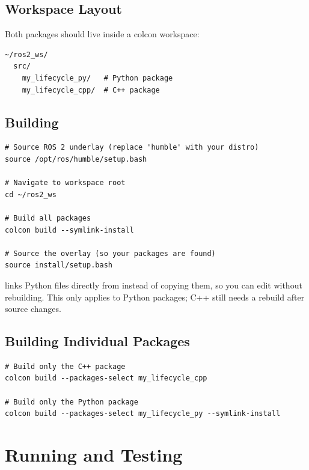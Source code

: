 \documentclass[11pt,a4paper]{csarticle}
\begin{document}
\subsection{Workspace Layout}

Both packages should live inside a colcon workspace:

\begin{lstlisting}[style=bash,caption={Workspace layout}]
~/ros2_ws/
  src/
    my_lifecycle_py/   # Python package
    my_lifecycle_cpp/  # C++ package
\end{lstlisting}

\subsection{Building}

\begin{lstlisting}[style=bash,caption={Build commands}]
# Source ROS 2 underlay (replace 'humble' with your distro)
source /opt/ros/humble/setup.bash

# Navigate to workspace root
cd ~/ros2_ws

# Build all packages
colcon build --symlink-install

# Source the overlay (so your packages are found)
source install/setup.bash
\end{lstlisting}

\begin{tipbox}
   links Python files directly from 
  instead of copying them, so you can edit without rebuilding.  This only
  applies to Python packages; C++ still needs a rebuild after source changes.
\end{tipbox}

\subsection{Building Individual Packages}

\begin{lstlisting}[style=bash,caption={Build a single package}]
# Build only the C++ package
colcon build --packages-select my_lifecycle_cpp

# Build only the Python package
colcon build --packages-select my_lifecycle_py --symlink-install
\end{lstlisting}

\section{Running and Testing}
\label{sec:running}
\end{document}
